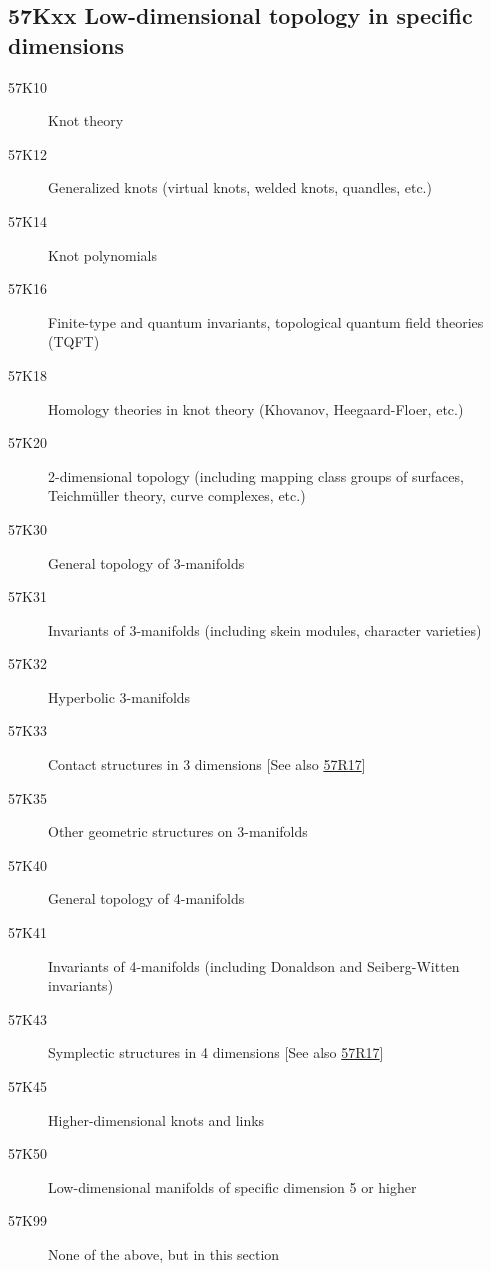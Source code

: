 \subsection*{57Kxx Low-dimensional topology in specific dimensions }\label{57Kxx}
\begin{description} 
\item [57K10]\label{57K10} Knot theory
\item [57K12]\label{57K12} Generalized knots (virtual knots, welded knots, quandles, etc.)
\item [57K14]\label{57K14} Knot polynomials
\item [57K16]\label{57K16} Finite-type and quantum invariants, topological quantum field theories (TQFT)
\item [57K18]\label{57K18} Homology theories in knot theory (Khovanov, Heegaard-Floer, etc.)
\item [57K20]\label{57K20} 2-dimensional topology (including mapping class groups of surfaces, Teichmüller theory, curve complexes, etc.)
\item [57K30]\label{57K30} General topology of 3-manifolds
\item [57K31]\label{57K31} Invariants of 3-manifolds (including skein modules, character varieties)
\item [57K32]\label{57K32} Hyperbolic 3-manifolds
\item [57K33]\label{57K33} Contact structures in 3 dimensions [See also \hyperref[57R17]{57R17}]
\item [57K35]\label{57K35} Other geometric structures on 3-manifolds
\item [57K40]\label{57K40} General topology of 4-manifolds
\item [57K41]\label{57K41} Invariants of 4-manifolds (including Donaldson and Seiberg-Witten invariants)
\item [57K43]\label{57K43} Symplectic structures in 4 dimensions [See also \hyperref[57R17]{57R17}]
\item [57K45]\label{57K45} Higher-dimensional knots and links 
\item [57K50]\label{57K50} Low-dimensional manifolds of specific dimension 5 or higher
\item [57K99]\label{57K99} None of the above, but in this section 
\end{description}
